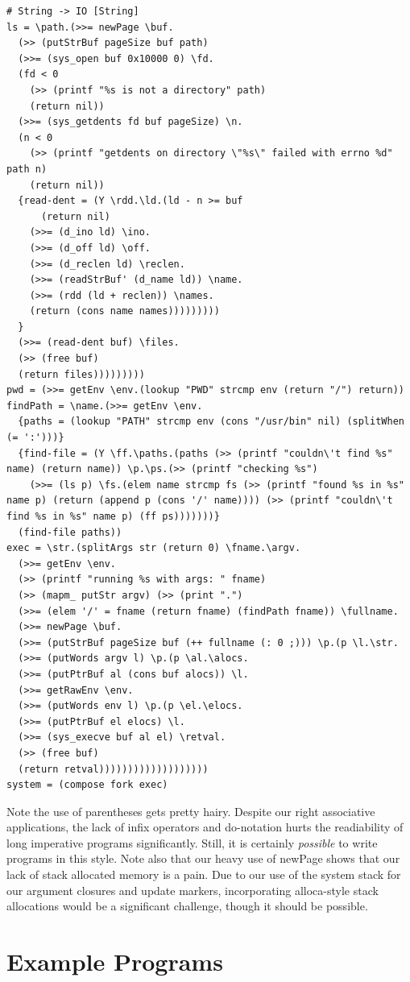 \begin{verbatim}
# String -> IO [String]
ls = \path.(>>= newPage \buf.
  (>> (putStrBuf pageSize buf path) 
  (>>= (sys_open buf 0x10000 0) \fd.
  (fd < 0 
    (>> (printf "%s is not a directory" path)
    (return nil))
  (>>= (sys_getdents fd buf pageSize) \n.
  (n < 0 
    (>> (printf "getdents on directory \"%s\" failed with errno %d" path n)
    (return nil))
  {read-dent = (Y \rdd.\ld.(ld - n >= buf
      (return nil)
    (>>= (d_ino ld) \ino.
    (>>= (d_off ld) \off.
    (>>= (d_reclen ld) \reclen.
    (>>= (readStrBuf' (d_name ld)) \name.
    (>>= (rdd (ld + reclen)) \names.
    (return (cons name names)))))))))
  }
  (>>= (read-dent buf) \files.
  (>> (free buf)
  (return files)))))))))
pwd = (>>= getEnv \env.(lookup "PWD" strcmp env (return "/") return))
findPath = \name.(>>= getEnv \env.
  {paths = (lookup "PATH" strcmp env (cons "/usr/bin" nil) (splitWhen (= ':')))}
  {find-file = (Y \ff.\paths.(paths (>> (printf "couldn\'t find %s" name) (return name)) \p.\ps.(>> (printf "checking %s")
    (>>= (ls p) \fs.(elem name strcmp fs (>> (printf "found %s in %s" name p) (return (append p (cons '/' name)))) (>> (printf "couldn\'t find %s in %s" name p) (ff ps)))))))}
  (find-file paths))
exec = \str.(splitArgs str (return 0) \fname.\argv.
  (>>= getEnv \env.
  (>> (printf "running %s with args: " fname)
  (>> (mapm_ putStr argv) (>> (print ".")
  (>>= (elem '/' = fname (return fname) (findPath fname)) \fullname.
  (>>= newPage \buf.
  (>>= (putStrBuf pageSize buf (++ fullname (: 0 ;))) \p.(p \l.\str.
  (>>= (putWords argv l) \p.(p \al.\alocs.
  (>>= (putPtrBuf al (cons buf alocs)) \l.
  (>>= getRawEnv \env.
  (>>= (putWords env l) \p.(p \el.\elocs.
  (>>= (putPtrBuf el elocs) \l.
  (>>= (sys_execve buf al el) \retval.
  (>> (free buf)
  (return retval)))))))))))))))))))
system = (compose fork exec)
\end{verbatim}

Note the use of parentheses gets pretty hairy. Despite our right associative
applications, the lack of infix operators and do-notation hurts the readiability
of long imperative programs significantly. Still, it is certainly
\emph{possible} to write programs in this style. Note also that our heavy use of
newPage shows that our lack of stack allocated memory is a pain. Due to our use
of the system stack for our argument closures and update markers, incorporating
alloca-style stack allocations would be a significant challenge, though it
should be possible. 

\section{Example Programs}

